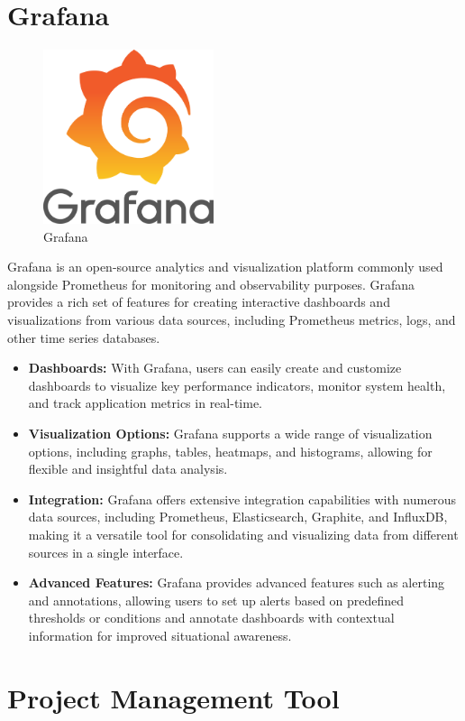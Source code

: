 \section{Grafana}

  
\begin{figure}[H]
  \centering
  \includegraphics[width=5cm]{Logos/grafana-logo.png}
  \caption{Grafana}
\end{figure}
Grafana is an open-source analytics and visualization platform commonly used alongside Prometheus for monitoring and observability purposes.
Grafana provides a rich set of features for creating interactive dashboards and visualizations from various data sources, including Prometheus metrics, logs, and other time series databases.

\begin{itemize}
  \item \textbf{Dashboards:} With Grafana, users can easily create and customize dashboards to visualize key performance indicators, monitor system health, and track application metrics in real-time.
  \item \textbf{Visualization Options:} Grafana supports a wide range of visualization options, including graphs, tables, heatmaps, and histograms, allowing for flexible and insightful data analysis.
  \item \textbf{Integration:} Grafana offers extensive integration capabilities with numerous data sources, including Prometheus, Elasticsearch, Graphite, and InfluxDB, making it a versatile tool for consolidating and visualizing data from different sources in a single interface.
  \item \textbf{Advanced Features:} Grafana provides advanced features such as alerting and annotations, allowing users to set up alerts based on predefined thresholds or conditions and annotate dashboards with contextual information for improved situational awareness.
\end{itemize}

\section{Project Management Tool}

